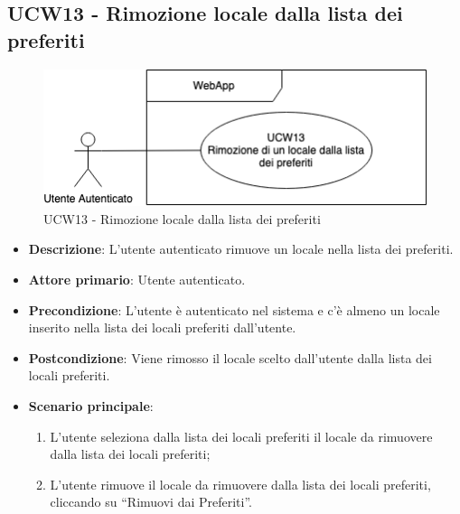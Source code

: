 \subsection{UCW13 - Rimozione locale dalla lista dei preferiti}
\begin{figure}[!h]
\centering
    \includegraphics[scale=0.5]{UC_images/UCW13.png} 
    \caption{UCW13 - Rimozione locale dalla lista dei preferiti}
\end{figure}
\begin{itemize}
	\item \textbf{Descrizione}: L'utente autenticato rimuove un locale nella lista dei preferiti.
    \item \textbf{Attore primario}: Utente autenticato.
    \item \textbf{Precondizione}:  L’utente è autenticato nel sistema e c'è almeno un locale inserito nella lista dei locali preferiti dall’utente.
    \item \textbf{Postcondizione}: Viene rimosso il locale scelto dall’utente dalla lista dei locali preferiti.
    \item \textbf{Scenario principale}:
    \begin{enumerate}
        \item L’utente seleziona dalla lista dei locali preferiti il locale da rimuovere dalla lista dei locali preferiti;
        \item L’utente rimuove il locale da rimuovere dalla lista dei locali preferiti, cliccando su “Rimuovi dai Preferiti”.
    \end{enumerate}
\end{itemize}

\pagebreak